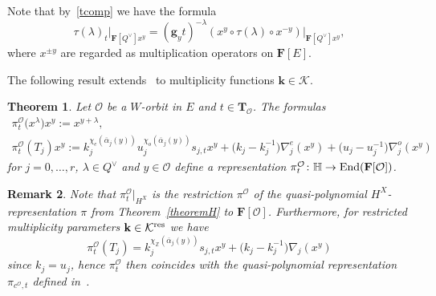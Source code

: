 \documentclass[pdftex]{sigma}
\numberwithin{equation}{section}
\newtheorem{Theorem}{Theorem}[section]
\newtheorem{Remark}[Theorem]{Remark} }
\begin{document}
Note that by~\eqref{tcomp} we have the formula
\[
\tau(\lambda)_t\vert_{\mathbf{F}[Q^\vee]x^y}=(\mathbf{g}_yt)^{-\lambda}(x^y\circ\tau(\lambda)\circ x^{-y})\vert_{\mathbf{F}[Q^\vee]x^y},
\]
where $x^{\pm y}$ are regarded as multiplication operators on $\mathbf{F}[E]$.

The following result extends~\cite[Theorem~1.1]{SSV2} to multiplicity functions $\mathbf{k}\in\mathcal{K}$.
\begin{Theorem}\label{mthm}
Let $\mathcal{O}$ be a $W$-orbit in $E$ and $t\in\mathbf{T}_\mathcal{O}$. The formulas
\begin{gather}
\pi_{t}^\mathcal{O}\bigl(x^\lambda\bigr)x^y:=x^{y+\lambda}, \nonumber\\
\pi_{t}^\mathcal{O}(T_j)x^y:=k_j^{\chi_e(\overline{\alpha}_j(y))}u_j^{\chi_o(\overline{\alpha}_j(y))}s_{j,t}x^y+\bigl(k_j-k_j^{-1}\bigr)\nabla_j^e(x^y)+
\bigl(u_j-u_j^{-1}\bigr)\nabla_j^o(x^y)
\label{qprepHH}
\end{gather}
for $j=0,\dots,r$, $\lambda\in Q^\vee$ and $y\in\mathcal{O}$ define a representation $\pi_{t}^\mathcal{O}\colon \mathbb{H}\rightarrow\textup{End}(\mathbf{F}[\mathcal{O}])$.
\end{Theorem}
\begin{Remark}
Note that $\pi_{t}^\mathcal{O}\vert_{H^X}$ is the restriction $\pi^{\mathcal{O}}$ of the quasi-polynomial $H^X$-represen\-tation $\pi$ from Theorem~\ref{theoremH} to $\mathbf{F}[\mathcal{O}]$. Furthermore, for restricted multiplicity
parameters $\mathbf{k}\in\mathcal{K}^{{\rm res}}$ we have
\[
\pi_{t}^\mathcal{O}(T_j)=k_j^{\chi_{\mathbb{Z}}(\overline{\alpha}_j(y))}s_{j,t}x^y+\bigl(k_j-k_j^{-1}\bigr)\nabla_j(x^y)
\]
since $k_j=u_j$, hence $\pi_{t}^\mathcal{O}$ then coincides with the quasi-polynomial representation $\pi_{c^\mathcal{O},t}$ defined in~\cite[Theorem~1.1]{SSV2}.
\end{Remark}
\end{document}
